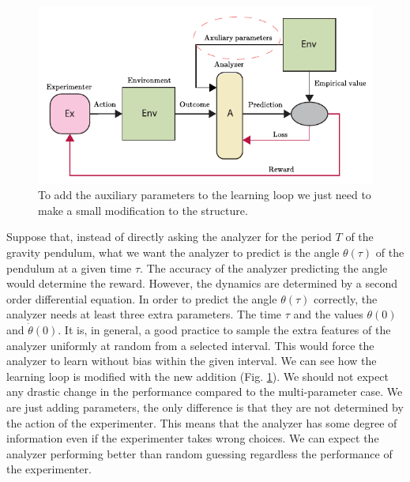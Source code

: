 \documentclass[11pt,a4paper,twoside]{report}
\newcommand{\+}{\textnormal{+} }
\theoremstyle{definition}
\numberwithin{equation}{chapter}
\begin{document}
  \begin{figure}
    \centering
    \includegraphics{figures/Auxiliary Parameters.pdf}
    \caption{To add the auxiliary parameters to the learning loop we just need
    to make a small modification to the structure.}
    \label{fig:auxiliaryparameter}
  \end{figure}

  Suppose that, instead of directly asking the analyzer for the period $T$ of
  the gravity pendulum, what we want the analyzer to predict is the angle
  $\theta(\tau)$ of the pendulum at a given time $\tau$. The accuracy of the
  analyzer predicting the angle would determine the reward. However, the
  dynamics are determined by a second order differential equation. In order to
  predict the angle $\theta(\tau)$ correctly, the analyzer needs at least three
  extra parameters. The time $\tau$ and the values $\theta(0)$ and
  $\dot{\theta}(0)$. It is, in general, a good practice to sample the extra
  features of the analyzer uniformly at random from a selected interval. This
  would force the analyzer to learn without bias within the given interval. We
  can see how the learning loop is modified with the new addition (Fig.
  \ref{fig:auxiliaryparameter}). We should not expect any drastic change in the
  performance compared to the multi-parameter case. We are just adding
  parameters, the only difference is that they are not determined by the
  action of the experimenter. This means that the analyzer has some
  degree of information even if the experimenter takes wrong choices. We can
  expect the analyzer performing better than random guessing regardless the
  performance of the experimenter.
\end{document}
